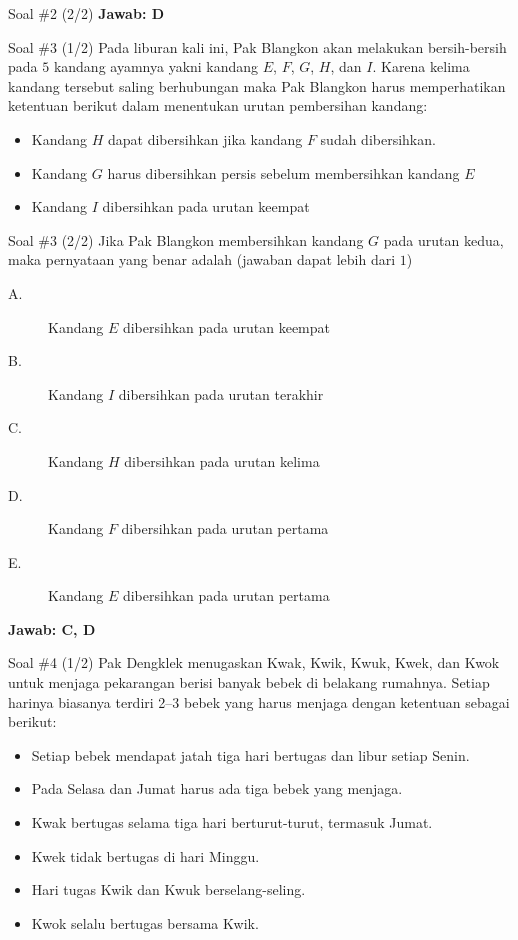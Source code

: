 \documentclass[english,t]{beamer}
\begin{document}
	\begin{frame}{Soal \#2 (2/2)}
		\pause \textbf{Jawab: D}
	\end{frame}

	\begin{frame}{Soal \#3 (1/2)} 
		Pada liburan kali ini, Pak Blangkon akan melakukan bersih-bersih pada $5$ kandang ayamnya yakni kandang $E$, $F$, $G$, $H$, dan $I$. Karena kelima kandang tersebut saling berhubungan maka Pak Blangkon harus memperhatikan ketentuan berikut dalam menentukan urutan pembersihan kandang:
		\begin{itemize}
			\item Kandang $H$ dapat dibersihkan jika kandang $F$ sudah dibersihkan.
			\item Kandang $G$ harus dibersihkan persis sebelum membersihkan kandang $E$
			\item Kandang $I$ dibersihkan pada urutan keempat
		\end{itemize}		
	\end{frame}

	\begin{frame}{Soal \#3 (2/2)} 
		Jika Pak Blangkon membersihkan kandang $G$ pada urutan kedua, maka pernyataan yang benar adalah (jawaban dapat lebih dari $1$)
		\begin{description}
			\item[A.] Kandang $E$ dibersihkan pada urutan keempat
			\item[B.] Kandang $I$ dibersihkan pada urutan terakhir
			\item[C.] Kandang $H$ dibersihkan pada urutan kelima
			\item[D.] Kandang $F$ dibersihkan pada urutan pertama
			\item[E.] Kandang $E$ dibersihkan pada urutan pertama
		\end{description}
		\pause \textbf{Jawab: C, D}
	\end{frame}


	\begin{frame}{Soal \#4 (1/2)}
		Pak Dengklek menugaskan Kwak, Kwik, Kwuk, Kwek, dan Kwok untuk menjaga pekarangan berisi banyak bebek di belakang rumahnya. Setiap harinya biasanya terdiri 2--3 bebek yang harus menjaga dengan ketentuan sebagai berikut:
		\begin{itemize}
			\item Setiap bebek mendapat jatah tiga hari bertugas dan libur setiap Senin.
			\item Pada Selasa dan Jumat harus ada tiga bebek yang menjaga.
			\item Kwak bertugas selama tiga hari berturut-turut, termasuk Jumat.
			\item Kwek tidak bertugas di hari Minggu.
			\item Hari tugas Kwik dan Kwuk berselang-seling.
			\item Kwok selalu bertugas bersama Kwik.
		\end{itemize}
	\end{frame}
\end{document}
